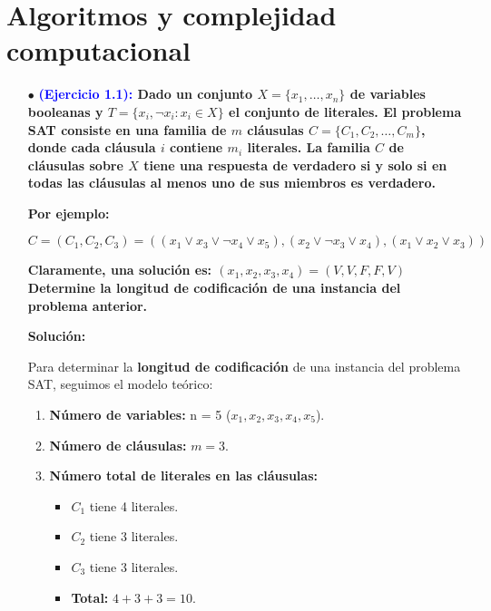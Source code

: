 \documentclass[12pt]{article}
\begin{document}
\section{Algoritmos y complejidad computacional}
{

    \begin{enumerate}
        \item[$\bullet$]\textbf{\textcolor{blue}{(Ejercicio 1.1): } Dado un conjunto $X = \{x_1, \dots, x_n\}$ de variables booleanas y $T = \{x_i, \neg x_i : x_i \in X\}$ el conjunto de literales.  
        El problema SAT consiste en una familia de $m$ cláusulas $C = \{C_1, C_2, \dots, C_m\}$, donde cada cláusula $i$ contiene $m_i$ literales.  
        La familia $C$ de cláusulas sobre $X$ tiene una respuesta de verdadero si y solo si en todas las cláusulas al menos uno de sus miembros es verdadero.}
        
        \textbf{Por ejemplo: }

            \[
                C = (C_1, C_2, C_3) = ((x_1 \lor x_3 \lor \neg x_4 \lor x_5), (x_2 \lor \neg x_3 \lor x_4), (x_1 \lor x_2 \lor x_3))
            \]

        \textbf{Claramente, una solución es: $(x_1, x_2, x_3, x_4) = (V, V, F, F, V)$ Determine la longitud de codificación de una instancia del problema anterior.}

        \textbf{Solución:}

        {
            Para determinar la \textbf{longitud de codificación} de una instancia del problema SAT, seguimos el modelo teórico:

            \begin{enumerate}
                \item \textbf{Número de variables:} n = 5 ($x_1, x_2, x_3, x_4, x_5$).
                \item \textbf{Número de cláusulas:} $m = 3$.
                \item \textbf{Número total de literales en las cláusulas:}
                \begin{itemize}
                    \item $C_1$ tiene 4 literales.
                    \item $C_2$ tiene 3 literales.
                    \item $C_3$ tiene 3 literales.
                    \item \textbf{Total:} $4 + 3 + 3 = 10$.
                \end{itemize}
            \end{enumerate}
            
}
\end{enumerate}}
\end{document}
